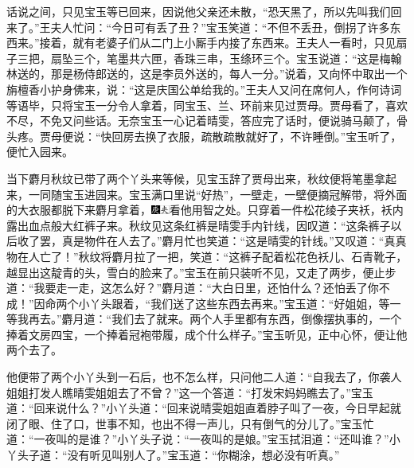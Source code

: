 话说之间，只见宝玉等已回来，因说他父亲还未散，“恐天黑了，所以先叫我们回来了。”王夫人忙问：“今日可有丢了丑？”宝玉笑道：“不但不丢丑，倒拐了许多东西来。”接着，就有老婆子们从二门上小厮手内接了东西来。王夫人一看时，只见扇子三把，扇坠三个，笔墨共六匣，香珠三串，玉绦环三个。宝玉说道：“这是梅翰林送的，那是杨侍郎送的，这是李员外送的，每人一分。”说着，又向怀中取出一个旃檀香小护身佛来，说：“这是庆国公单给我的。”王夫人又问在席何人，作何诗词等语毕，只将宝玉一分令人拿着，同宝玉、兰、环前来见过贾母。贾母看了，喜欢不尽，不免又问些话。无奈宝玉一心记着晴雯，答应完了话时，便说骑马颠了，骨头疼。贾母便说：“快回房去换了衣服，疏散疏散就好了，不许睡倒。”宝玉听了，便忙入园来。

当下麝月秋纹已带了两个丫头来等候，见宝玉辞了贾母出来，秋纹便将笔墨拿起来，一同随宝玉进园来。宝玉满口里说“好热”，一壁走，一壁便摘冠解带，将外面的大衣服都脱下来麝月拿着，{\includegraphics[width=3mm]{../Images/00004}\includegraphics[width=3mm]{../Images/00012}\footnotesize \kaishu 看他用智之处。}只穿着一件松花绫子夹袄，袄内露出血点般大红裤子来。秋纹见这条红裤是晴雯手内针线，因叹道：“这条裤子以后收了罢，真是物件在人去了。”麝月忙也笑道：“这是晴雯的针线。”又叹道：“真真物在人亡了！”秋纹将麝月拉了一把，笑道：“这裤子配着松花色袄儿、石青靴子，越显出这靛青的头，雪白的脸来了。”宝玉在前只装听不见，又走了两步，便止步道：“我要走一走，这怎么好？”麝月道：“大白日里，还怕什么？还怕丢了你不成！”因命两个小丫头跟着，“我们送了这些东西去再来。”宝玉道：“好姐姐，等一等我再去。”麝月道：“我们去了就来。两个人手里都有东西，倒像摆执事的，一个捧着文房四宝，一个捧着冠袍带履，成个什么样子。”宝玉听见，正中心怀，便让他两个去了。

他便带了两个小丫头到一石后，也不怎么样，只问他二人道：“自我去了，你袭人姐姐打发人瞧晴雯姐姐去了不曾？”这一个答道：“打发宋妈妈瞧去了。”宝玉道：“回来说什么？”小丫头道：“回来说晴雯姐姐直着脖子叫了一夜，今日早起就闭了眼、住了口，世事不知，也出不得一声儿，只有倒气的分儿了。”宝玉忙道：“一夜叫的是谁？”小丫头子说：“一夜叫的是娘。”宝玉拭泪道：“还叫谁？”小丫头子道：“没有听见叫别人了。”宝玉道：“你糊涂，想必没有听真。”

